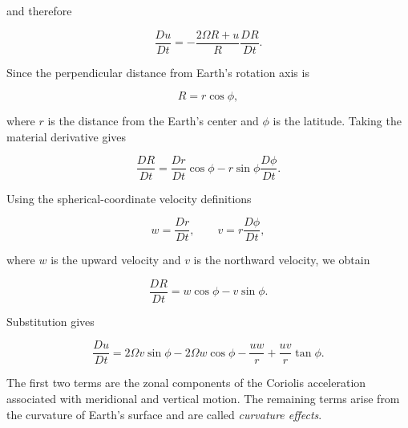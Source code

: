 \documentclass[10pt,twocolumn]{memoir}
\begin{document}
and therefore

\begin{equation}
    \frac{D u}{D t} = -\frac{2\Omega R+u}{R}\frac{D R}{D t}.
\end{equation}

Since the perpendicular distance from Earth's rotation axis is

\begin{equation}
    R=r\cos\phi,
\end{equation}

where $r$ is the distance from the Earth's center and $\phi$ is the latitude. Taking the material derivative gives

\begin{equation}
    \frac{DR}{Dt} = \frac{Dr}{Dt}\cos\phi - r\sin\phi\frac{D\phi}{Dt}.
\end{equation}

Using the spherical-coordinate velocity definitions

\begin{equation}
    w = \frac{Dr}{Dt}, \qquad v = r\frac{D\phi}{Dt},
\end{equation}

where $w$ is the upward velocity and $v$ is the northward velocity, we obtain

\begin{equation}
    \frac{DR}{Dt}
    =
    w\cos\phi-v\sin\phi.
\end{equation}

Substitution gives

\begin{equation}
    \frac{D u}{D t} = 2\Omega v\sin\phi - 2\Omega w\cos\phi - \frac{uw}{r} + \frac{uv}{r}\tan\phi.
\label{eq:c1_zonal_acceleration}
\end{equation}

The first two terms are the zonal components of the Coriolis acceleration associated with meridional and vertical motion. The remaining terms arise from the curvature of Earth's surface and are called \textit{curvature effects}.
\end{document}
